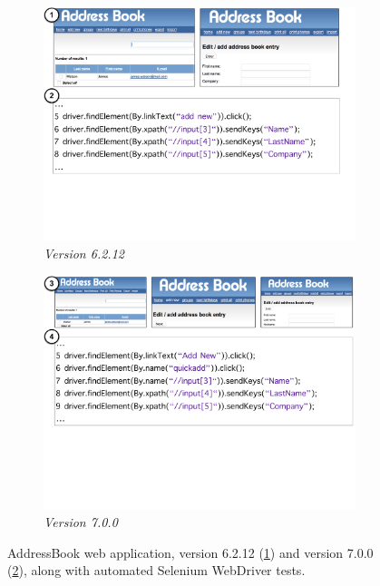
\begin{figure}[t]
\centering
\begin{subfigure}{\columnwidth}
\centering
\includegraphics[trim=0cm 7.5cm 1.8cm 0cm, clip=true, scale=0.23]{images/addressbook-version1.pdf}
\caption{\emph{Version 6.2.12}}
\label{fig:ab1} 
\end{subfigure}
\begin{subfigure}{\columnwidth}
\centering
\includegraphics[trim=0cm 9.5cm 0cm 0cm, clip=true,  scale=0.260]{images/addressbook-version2.pdf}
\caption{\emph{Version 7.0.0}}
\label{fig:ab2} 
\end{subfigure}
\caption{AddressBook web application, version 6.2.12 (\ref{fig:ab1}) and version 7.0.0 (\ref{fig:ab2}), along with  automated Selenium WebDriver tests. } 
\label{fig:example} 
\end{figure}

